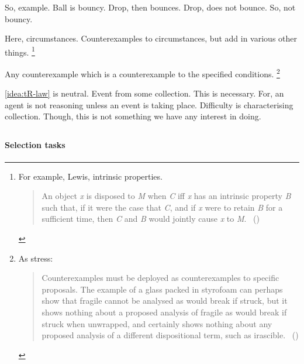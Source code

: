 \begin{note}
  So, example.
  Ball is bouncy.
  Drop, then bounces.
  Drop, does not bounce.
  So, not bouncy.

  Here, circumstances.
  Counterexamples to circumstances, but add in various other things.%
  \footnote{
    For example, Lewis, intrinsic properties.

  \begin{quote}
    An object \emph{x} is disposed to \emph{M} when \emph{C} iff \emph{x} has an intrinsic property \emph{B} such that, if it were the case that \emph{C}, and if \emph{x} were to retain \emph{B} for a sufficient time, then \emph{C} and \emph{B} would jointly cause \emph{x} to \emph{M}.%
    \mbox{ }\hfill\mbox{(\citeauthor[\S1.4]{Choi:2021wg})}
  \end{quote}
  }

  Any counterexample which is a counterexample to the specified conditions.%
  \footnote{
    As \citeauthor{Bonevac:2011tz} stress:
    \begin{quote}
    Counterexamples must be deployed as counterexamples to specific proposals.
    The example of a glass packed in styrofoam can perhaps show that fragile cannot be analysed as would break if struck, but it shows nothing about a proposed analysis of fragile as would break if struck when unwrapped, and certainly shows nothing about any proposed analysis of a different dispositional term, such as irascible.%
    \mbox{ }\hfill\mbox{(\citeyear[1144]{Bonevac:2011tz})}
  \end{quote}
  }

  \autoref{idea:tR-law} is neutral.
  Event from some collection.
  This is necessary.
  For, an agent is not reasoning unless an event is taking place.
  Difficulty is characterising collection.
  Though, this is not something we have any interest in doing.
\end{note}

\subsection{}
\label{sec:illu3-1}

\paragraph*{Selection tasks}
\nocite{Wason:1968aa}
\nocite{Wason:1971aa}

